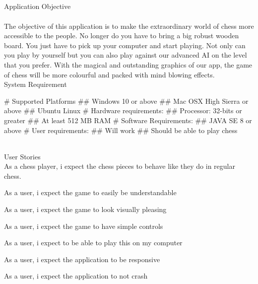 \documentclass{article}
\begin{document}
\\\\\\\\
\LARGE
Application Objective
\\
\normalsize
\\
The objective of this application is to make the extraordinary world of chess more accessible
to the people. No longer do you have to bring a big robust wooden board. You just have to
pick up your computer and start playing. Not only can you play by yourself but you can also play
against our advanced AI on the level that you prefer. With the magical and outstanding graphics
of our app, the game of chess will be more colourful and packed with mind blowing effects.
\\

\LARGE\noindent
System Requirement
\normalsize
\begin{easylist}[itemize]
    # Supported Platforms 
    ## Windows 10 or above
    ## Mac OSX High Sierra or above
    ## Ubuntu Linux
    # Hardware requirements:
    ## Processor: 32-bits or greater
    ## At least 512 MB RAM
    # Software Requirements:
    ## JAVA SE 8 or above
    # User requirements:
    ## Will work
    ## Should be able to play chess
\end{easylist}
\LARGE\noindent
\\
User Stories
\normalsize
\\
As a chess player, i expect the chess pieces to behave like they do in regular chess.

\noindent
As a user, i expect the game to easily be understandable

\noindent
As a user, i expect the game to look visually pleasing

\noindent
As a user, i expect the game to have simple controls

\noindent
As a user, i expect to be able to play this on my computer

\noindent
As a user, i expect the application to be responsive

\noindent
As a user, i expect the application to not crash
\end{document}
